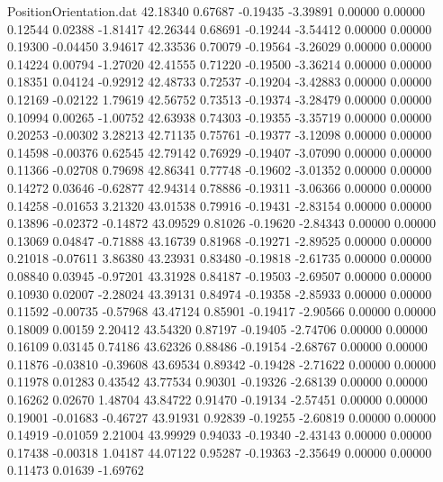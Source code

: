 \begin{filecontents}{PositionOrientation.dat}
  42.18340    0.67687   -0.19435    -3.39891    0.00000    0.00000    0.12544    0.02388   -1.81417
  42.26344    0.68691   -0.19244    -3.54412    0.00000    0.00000    0.19300   -0.04450    3.94617
  42.33536    0.70079   -0.19564    -3.26029    0.00000    0.00000    0.14224    0.00794   -1.27020
  42.41555    0.71220   -0.19500    -3.36214    0.00000    0.00000    0.18351    0.04124   -0.92912
  42.48733    0.72537   -0.19204    -3.42883    0.00000    0.00000    0.12169   -0.02122    1.79619
  42.56752    0.73513   -0.19374    -3.28479    0.00000    0.00000    0.10994    0.00265   -1.00752
  42.63938    0.74303   -0.19355    -3.35719    0.00000    0.00000    0.20253   -0.00302    3.28213
  42.71135    0.75761   -0.19377    -3.12098    0.00000    0.00000    0.14598   -0.00376    0.62545
  42.79142    0.76929   -0.19407    -3.07090    0.00000    0.00000    0.11366   -0.02708    0.79698
  42.86341    0.77748   -0.19602    -3.01352    0.00000    0.00000    0.14272    0.03646   -0.62877
  42.94314    0.78886   -0.19311    -3.06366    0.00000    0.00000    0.14258   -0.01653    3.21320
  43.01538    0.79916   -0.19431    -2.83154    0.00000    0.00000    0.13896   -0.02372   -0.14872
  43.09529    0.81026   -0.19620    -2.84343    0.00000    0.00000    0.13069    0.04847   -0.71888
  43.16739    0.81968   -0.19271    -2.89525    0.00000    0.00000    0.21018   -0.07611    3.86380
  43.23931    0.83480   -0.19818    -2.61735    0.00000    0.00000    0.08840    0.03945   -0.97201
  43.31928    0.84187   -0.19503    -2.69507    0.00000    0.00000    0.10930    0.02007   -2.28024
  43.39131    0.84974   -0.19358    -2.85933    0.00000    0.00000    0.11592   -0.00735   -0.57968
  43.47124    0.85901   -0.19417    -2.90566    0.00000    0.00000    0.18009    0.00159    2.20412
  43.54320    0.87197   -0.19405    -2.74706    0.00000    0.00000    0.16109    0.03145    0.74186
  43.62326    0.88486   -0.19154    -2.68767    0.00000    0.00000    0.11876   -0.03810   -0.39608
  43.69534    0.89342   -0.19428    -2.71622    0.00000    0.00000    0.11978    0.01283    0.43542
  43.77534    0.90301   -0.19326    -2.68139    0.00000    0.00000    0.16262    0.02670    1.48704
  43.84722    0.91470   -0.19134    -2.57451    0.00000    0.00000    0.19001   -0.01683   -0.46727
  43.91931    0.92839   -0.19255    -2.60819    0.00000    0.00000    0.14919   -0.01059    2.21004
  43.99929    0.94033   -0.19340    -2.43143    0.00000    0.00000    0.17438   -0.00318    1.04187
  44.07122    0.95287   -0.19363    -2.35649    0.00000    0.00000    0.11473    0.01639   -1.69762

\end{filecontents}
